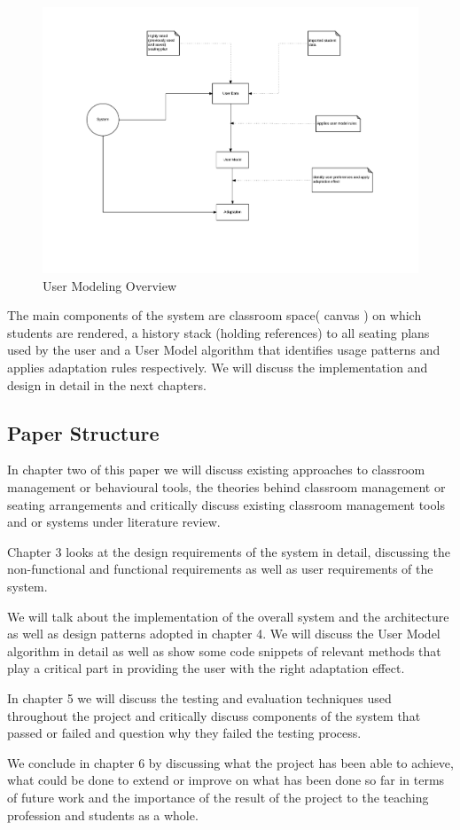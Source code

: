 \begin{figure}[!ht]
\caption{User Modeling Overview}
    \label{fig:User-Model}
    \centering
    \includegraphics[scale=0.5]{figures/UM_Overview}
\end{figure}

The main components of the system are classroom space( canvas ) on which students are rendered, a history stack (holding references) to all seating plans used by the user and a User Model algorithm that identifies usage patterns and applies adaptation rules respectively. We will discuss the implementation and design in detail in the next chapters.

\subsection{Paper Structure}
In chapter two of this paper we will discuss existing approaches to classroom management or behavioural tools, the theories behind classroom management or seating arrangements and  critically discuss existing classroom management tools and or systems under literature review.

Chapter 3 looks at the design requirements of the system in detail, discussing the non-functional and functional requirements as well as user requirements of the system.

We will talk about the implementation of the overall system and the architecture as well as design patterns adopted in chapter 4. We will discuss the User Model algorithm in detail as well as show some code snippets of relevant methods that play a critical part in providing the user with the right adaptation effect.

In chapter 5 we will discuss the testing and evaluation techniques used throughout the project and critically discuss components of the system that passed or failed and question why they failed the testing process.

We conclude in chapter 6 by discussing what the project has been able to achieve, what could be done to extend or improve on what has been done so far in terms of future work and the importance of the result of the project to the teaching profession and students as a whole.

